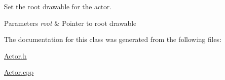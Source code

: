 Set the root drawable for the actor. 


\begin{DoxyParams}{Parameters}
{\em root} & Pointer to root drawable \\
\hline
\end{DoxyParams}


The documentation for this class was generated from the following files\+:\begin{DoxyCompactItemize}
\item 
\hyperlink{_actor_8h}{Actor.\+h}\item 
\hyperlink{_actor_8cpp}{Actor.\+cpp}\end{DoxyCompactItemize}
